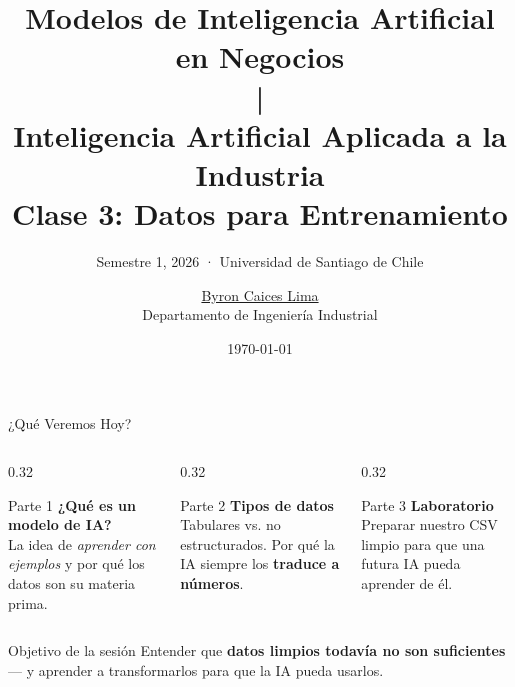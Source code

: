 \documentclass[aspectratio=169]{beamer}
\title{Modelos de Inteligencia Artificial en Negocios\\{\normalsize |}\\ Inteligencia Artificial Aplicada a la Industria\\{\tiny Clase 3: Datos para Entrenamiento}}
\subtitle{{\small Semestre 1, 2026 · Universidad de Santiago de Chile}}
\author{\href{https://www.linkedin.com/in/byron-caices/}{Byron Caices Lima} \\ \small Departamento de Ingeniería Industrial}
\date{\today}
\begin{document}
\maketitle


\begin{frame}{¿Qué Veremos Hoy?}
  \small
  \begin{columns}[T]
    \begin{column}{0.32\textwidth}
      \begin{conceptbox}{\faBrain\enspace Parte 1}
        \small
        \textbf{¿Qué es un modelo de IA?}\\[4pt]
        La idea de \textit{aprender con ejemplos} y por qué los datos son su materia prima.
      \end{conceptbox}
    \end{column}
    \begin{column}{0.32\textwidth}
      \begin{conceptbox}{\faTable\enspace Parte 2}
        \small
        \textbf{Tipos de datos}\\[4pt]
        Tabulares vs. no estructurados. Por qué la IA siempre los \textbf{traduce a números}.
      \end{conceptbox}
    \end{column}
    \begin{column}{0.32\textwidth}
      \begin{conceptbox}{\faFlask\enspace Parte 3}
        \small
        \textbf{Laboratorio}\\[4pt]
        Preparar nuestro CSV limpio para que una futura IA pueda aprender de él.
      \end{conceptbox}
    \end{column}
  \end{columns}
  \vspace{0.3cm}
  \begin{alertblock}{\faLightbulb\enspace Objetivo de la sesión}
    \centering\small
    Entender que \textbf{datos limpios todavía no son suficientes} --- y aprender a transformarlos para que la IA pueda usarlos.
  \end{alertblock}
\end{frame}

\end{document}
